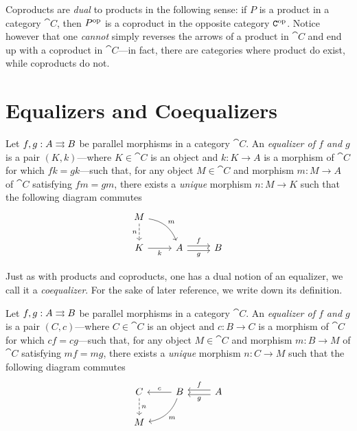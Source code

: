 \begin{remark}[Duality]
    \label{rem:coproducts-dual-product}
    Coproducts are \emph{dual} to products in the following sense: if \(P\) is a
    product in a category \(\cat C\), then \(P^{\mathrm{op}}\) is a coproduct in the
    opposite category \(\texttt C^{\mathrm{op}}\). Notice however that one \emph{cannot} simply
    reverses the arrows of a product in \(\cat C\) and end up with a coproduct in
    \(\cat C\)---in fact, there are categories where product do exist, while
    coproducts do not.
\end{remark}

\section{Equalizers and Coequalizers}

\begin{definition}[Equalizer]
    \label{def:equalizer}
    Let \(f, g: A \rightrightarrows B\) be parallel morphisms in a category \(\cat C\). An
    \emph{equalizer of \(f\) and \(g\)} is a pair \((K, k)\)---where
    \(K \in \cat C\) is an object and \(k: K \to A\) is a morphism of \(\cat C\) for
    which \(f k = g k\)---such that, for any object \(M \in \cat C\) and morphism
    \(m: M \to A\) of \(\cat C\) satisfying \(f m = g m\), there exists a
    \emph{unique} morphism \(n: M \to K\) such that the following diagram commutes
    \[
        \begin{tikzcd}
            M \ar[d, dashed, "n"'] \ar[rd, bend left, "m"] & &
            \\
            K \ar[r, "k"'] &A \ar[r, shift left, "f"] \ar[r, shift right, "g"'] &B
        \end{tikzcd}
    \]
\end{definition}

Just as with products and coproducts, one has a dual notion of an equalizer, we
call it a \emph{coequalizer}. For the sake of later reference, we write down its
definition.

\begin{definition}[Coequalizer]
    \label{def:coequalizer}
    Let \(f, g: A \rightrightarrows B\) be parallel morphisms in a category \(\cat C\). An
    \emph{equalizer of \(f\) and \(g\)} is a pair \((C, c)\)---where
    \(C \in \cat C\) is an object and \(c: B \to C\) is a morphism of \(\cat C\) for
    which \(c f = c g\)---such that, for any object \(M \in \cat C\) and morphism
    \(m: B \to M\) of \(\cat C\) satisfying \(m f = m g\), there exists a
    \emph{unique} morphism \(n: C \to M\) such that the following diagram commutes
    \[
        \begin{tikzcd}
            C \ar[d, dashed, "n"]
            & B \ar[l, "c"'] \ar[ld, "m", bend left]
            & A \ar[l, shift left, "g"] \ar[l, shift right, "f"']
            \\
            M& &
        \end{tikzcd}
    \]

\end{definition}

